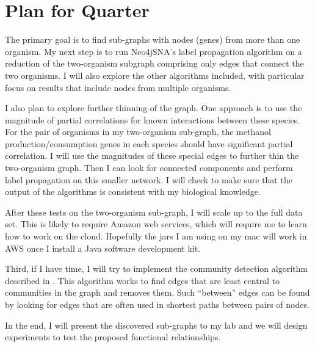 \documentclass[12pt]{article}
\begin{document}
\section{Plan for Quarter}  %

The primary goal is to find sub-graphs with nodes (genes) from more than one organism. 
My next step is to run Neo4jSNA's label propagation algorithm on a reduction of the two-organism subgraph comprising only edges that connect the two organisms.
I will also explore the other algorithms included, with particular focus on results that include nodes from multiple organisms. 

I also plan to explore further thinning of the graph. 
One approach is to use the magnitude of partial correlations for known interactions between these species.
For the pair of organisms in my two-organism sub-graph, the methanol production/consumption genes in each species should have significant partial correlation. 
I will use the magnitudes of these special edges to further thin the two-organism graph. 
Then I can look for connected components and perform label propagation on this smaller network.  
I will check to make sure that the output of the algorithms is consistent with my biological knowledge.

After these tests on the two-organism sub-graph, I will scale up to the full data set.
This is likely to require Amazon web services, which will require me to learn how to work on the cloud. 
Hopefully the jars I am using on my mac will work in AWS once I install a Java software development kit.

Third, if I have time, I will try to implement the community detection algorithm described in \cite{girvan2002community}.
This algorithm works to find edges that are least central to communities in the graph and removes them.
Such ``between'' edges can be found by looking for edges that are often used in shortest paths between pairs of nodes.

In the end, I will present the discovered sub-graphs to my lab and we will design experiments to test the proposed functional relationships.

%



 
 
\end{document}
